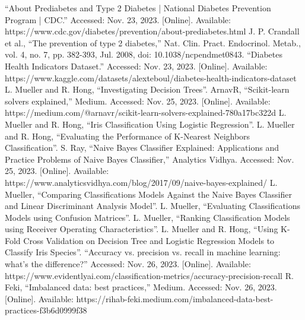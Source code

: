 \documentclass[journal]{IEEEtran}
\begin{document}
\begin{thebibliography}{00}
	{“About Prediabetes and Type 2 Diabetes | National Diabetes Prevention Program | CDC.” Accessed: Nov. 23, 2023. [Online]. Available: https://www.cdc.gov/diabetes/prevention/about-prediabetes.html}
	{J. P. Crandall et al., “The prevention of type 2 diabetes,” Nat. Clin. Pract. Endocrinol. Metab., vol. 4, no. 7, pp. 382-393, Jul. 2008, doi: 10.1038/ncpendmet0843.}
	{“Diabetes Health Indicators Dataset.” Accessed: Nov. 23, 2023. [Online]. Available: https://www.kaggle.com/datasets/alexteboul/diabetes-health-indicators-dataset}
	{L. Mueller and R. Hong, “Investigating Decision Trees”.}
	{ArnavR, “Scikit-learn solvers explained,” Medium. Accessed: Nov. 25, 2023. [Online]. Available: https://medium.com/@arnavr/scikit-learn-solvers-explained-780a17bc322d}
	{L. Mueller and R. Hong, “Iris Classification Using Logistic Regression”.}
	{L. Mueller and R. Hong, “Evaluating the Performance of K-Nearest Neighbors Classification”.}
	{S. Ray, “Naive Bayes Classifier Explained: Applications and Practice Problems of Naive Bayes Classifier,” Analytics Vidhya. Accessed: Nov. 25, 2023. [Online]. Available: https://www.analyticsvidhya.com/blog/2017/09/naive-bayes-explained/}
	{L. Mueller, “Comparing Classifications Models Against the Naive Bayes Classifier and Linear Discriminant Analysis Model”.}
	{L. Mueller, “Evaluating Classifications Models using Confusion Matrices”.}
	{L. Mueller, “Ranking Classification Models using Receiver Operating Characteristics”.}
	{L. Mueller and R. Hong, “Using K-Fold Cross Validation on Decision Tree and Logistic Regression Models to Classify Iris Species”.}
	{“Accuracy vs. precision vs. recall in machine learning: what's the difference?” Accessed: Nov. 26, 2023. [Online]. Available: https://www.evidentlyai.com/classification-metrics/accuracy-precision-recall}
	{R. Feki, “Imbalanced data: best practices,” Medium. Accessed: Nov. 26, 2023. [Online]. Available: https://rihab-feki.medium.com/imbalanced-data-best-practices-f3b6d0999f38}



\end{thebibliography}
\end{document}
